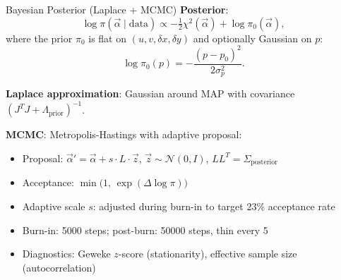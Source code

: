 \documentclass[aspectratio=169]{beamer}
\begin{document}
\begin{frame}{Bayesian Posterior (Laplace + MCMC)}
\small
\textbf{Posterior}:
\[
\log \pi(\vec{\alpha} \mid \mathrm{data}) \propto -\tfrac{1}{2}\chi^2(\vec{\alpha}) + \log \pi_0(\vec{\alpha}),
\]
where the prior $\pi_0$ is flat on $(u, v, \delta x, \delta y)$ and optionally Gaussian on $p$:
\[
\log \pi_0(p) = -\frac{(p - p_0)^2}{2\sigma_p^2}.
\]

\textbf{Laplace approximation}: Gaussian around MAP with covariance $(J^TJ + \Lambda_\mathrm{prior})^{-1}$.

\vspace{0.1cm}
\textbf{MCMC}: Metropolis-Hastings with adaptive proposal:
\begin{itemize}
\item Proposal: $\vec{\alpha}' = \vec{\alpha} + s \cdot L \cdot \vec{z}$, \quad $\vec{z} \sim \mathcal{N}(0, I)$, \quad $LL^T = \Sigma_\mathrm{posterior}$
\item Acceptance: $\min\bigl(1,\, \exp(\Delta \log\pi)\bigr)$
\item Adaptive scale $s$: adjusted during burn-in to target 23\% acceptance rate
\item Burn-in: 5000 steps; post-burn: 50000 steps, thin every 5
\item Diagnostics: Geweke $z$-score (stationarity), effective sample size (autocorrelation)
\end{itemize}
\end{frame}
\end{document}
